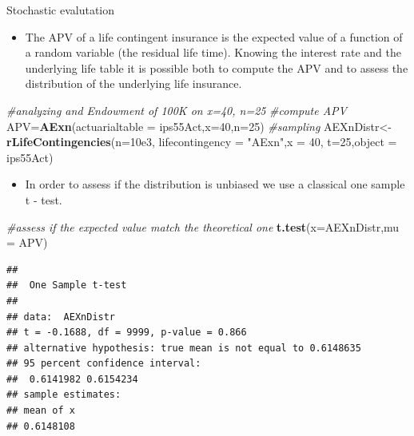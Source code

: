 \documentclass[ignorenonframetext,]{beamer}
\newenvironment{Shaded}{\begin{snugshade}}{\end{snugshade}}
\newcommand{\KeywordTok}[1]{\textcolor[rgb]{0.13,0.29,0.53}{\textbf{{#1}}}}
\newcommand{\DataTypeTok}[1]{\textcolor[rgb]{0.13,0.29,0.53}{{#1}}}
\newcommand{\DecValTok}[1]{\textcolor[rgb]{0.00,0.00,0.81}{{#1}}}
\newcommand{\FloatTok}[1]{\textcolor[rgb]{0.00,0.00,0.81}{{#1}}}
\newcommand{\StringTok}[1]{\textcolor[rgb]{0.31,0.60,0.02}{{#1}}}
\newcommand{\CommentTok}[1]{\textcolor[rgb]{0.56,0.35,0.01}{\textit{{#1}}}}
\newcommand{\NormalTok}[1]{{#1}}
\begin{document}
\begin{frame}[fragile]{Stochastic evalutation}

\begin{itemize}[<+->]
\itemsep1pt\parskip0pt
\item
  The APV of a life contingent insurance is the expected value of a
  function of a random variable (the residual life time). Knowing the
  interest rate and the underlying life table it is possible both to
  compute the APV and to assess the distribution of the underlying life
  insurance.
\end{itemize}

\begin{Shaded}
\begin{Highlighting}[]
\CommentTok{#analyzing and Endowment of 100K on x=40, n=25}
\CommentTok{#compute APV}
\NormalTok{APV=}\KeywordTok{AExn}\NormalTok{(}\DataTypeTok{actuarialtable =} \NormalTok{ips55Act,}\DataTypeTok{x=}\DecValTok{40}\NormalTok{,}\DataTypeTok{n=}\DecValTok{25}\NormalTok{) }
\CommentTok{#sampling}
\NormalTok{AEXnDistr<-}\KeywordTok{rLifeContingencies}\NormalTok{(}\DataTypeTok{n=}\FloatTok{10e3}\NormalTok{,}
\DataTypeTok{lifecontingency =} \StringTok{"AExn"}\NormalTok{,}\DataTypeTok{x =} \DecValTok{40}\NormalTok{,}
\DataTypeTok{t=}\DecValTok{25}\NormalTok{,}\DataTypeTok{object =} \NormalTok{ips55Act)}
\end{Highlighting}
\end{Shaded}

\end{frame}

\begin{frame}[fragile]

\begin{itemize}[<+->]
\itemsep1pt\parskip0pt
\item
  In order to assess if the distribution is unbiased we use a classical
  one sample t - test.
\end{itemize}

\begin{Shaded}
\begin{Highlighting}[]
\CommentTok{#assess if the expected value match the theoretical one}
\KeywordTok{t.test}\NormalTok{(}\DataTypeTok{x=}\NormalTok{AEXnDistr,}\DataTypeTok{mu =} \NormalTok{APV)}
\end{Highlighting}
\end{Shaded}

\begin{verbatim}
## 
##  One Sample t-test
## 
## data:  AEXnDistr
## t = -0.1688, df = 9999, p-value = 0.866
## alternative hypothesis: true mean is not equal to 0.6148635
## 95 percent confidence interval:
##  0.6141982 0.6154234
## sample estimates:
## mean of x 
## 0.6148108
\end{verbatim}

\end{frame}
\end{document}
